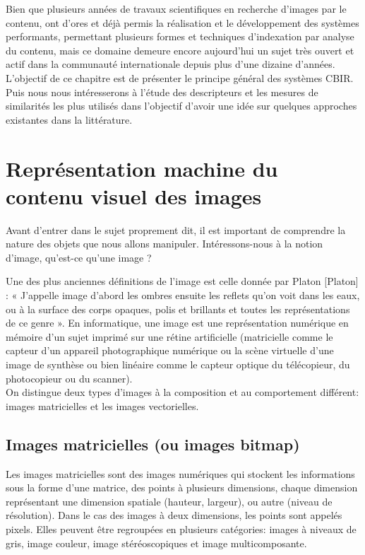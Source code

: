 Bien que plusieurs années de travaux scientifiques en recherche d’images par le contenu, ont d’ores et déjà permis la réalisation et le développement des systèmes performants, permettant plusieurs formes et techniques d’indexation par analyse du contenu, mais ce domaine demeure encore aujourd’hui un sujet très ouvert et actif dans la communauté internationale depuis plus d’une dizaine d'années.
\\

L'objectif de ce chapitre est de présenter le principe général des systèmes CBIR. Puis nous nous intéresserons à l'étude des descripteurs et les mesures de similarités les plus utilisés dans l’objectif d’avoir une idée sur quelques approches existantes dans la littérature. 



\section{Représentation machine du contenu visuel des images}

Avant d’entrer dans le sujet proprement dit, il est important de comprendre la nature des objets que nous allons manipuler. Intéressons-nous à la notion d’image, qu’est-ce qu’une image ?

Une des plus anciennes définitions de l'image est celle donnée par Platon [Platon] : « J'appelle image d'abord les ombres ensuite les reflets qu'on voit dans les eaux, ou à la surface des corps opaques, polis et brillants et toutes les représentations de ce genre ». En informatique, une image est une représentation numérique en mémoire d’un sujet imprimé sur une rétine artificielle (matricielle comme le capteur d’un appareil photographique numérique
ou la scène virtuelle d’une image de synthèse ou bien linéaire comme le capteur optique du télécopieur, du photocopieur ou du scanner). \\

On distingue deux types d’images à la composition et au comportement différent: images matricielles et les images vectorielles.

\subsection{Images matricielles (ou images bitmap)}
Les images matricielles sont des images numériques qui stockent les informations sous la forme d’une matrice, des points à plusieurs dimensions, chaque dimension représentant une dimension spatiale (hauteur, largeur), ou autre (niveau de résolution). Dans le cas des images à deux dimensions, les points sont appelés pixels. Elles peuvent être regroupées en plusieurs catégories: images à niveaux de gris, image couleur, image stéréoscopiques et image multicomposante.


